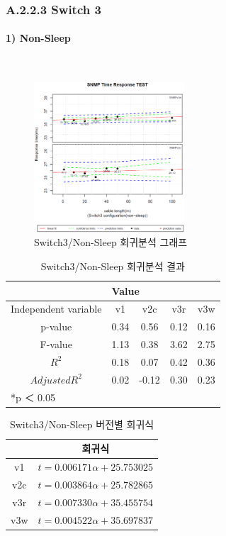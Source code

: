 \documentclass[11pt
  , a4paper
  , article
  , oneside
]{memoir}
\begin{document}
\subsubsection{A.2.2.3 Switch 3}
\paragraph{1) Non-Sleep}
   　
\begin{figure}[h!]
  \centering
  \includegraphics[width=0.5\textwidth]{./images/s3sx.eps}
  \caption{Switch3/Non-Sleep 회귀분석 그래프}
\end{figure}


\begin{table}[!htb]
\begin{center}
\begin{tabular}{c|c|c|c|c}\hline
& \multicolumn{4}{l}{Value} \\ \hline
Independent variable & v1 & v2c & v3r & v3w \\ \hline\hline
p-value& 0.34 & 0.56 & 0.12 & 0.16 \\ \hline
F-value& 1.13 & 0.38 & 3.62 & 2.75 \\ \hline
$  R^2  $ & 0.18 & 0.07 & 0.42 & 0.36 \\\hline
$ Adjusted R^2 $ & 0.02 & -0.12 & 0.30 & 0.23 \\\hline 
\multicolumn{5}{l}{*p ＜ 0.05} \\ \hline
\end{tabular}
\caption{Switch3/Non-Sleep 회귀분석 결과}
\end{center}
\end{table} 

\begin{table}[!htb]
\begin{center}
\begin{tabular}{c|c}\hline
 & 회귀식  \\ \hline\hline
v1 &  $ t=0.006171\alpha + 25.753025 $  \\ 
v2c & $ t=0.003864\alpha + 25.782865 $ \\ 
v3r & $ t=0.007330\alpha + 35.455754 $ \\ 
v3w & $ t=0.004522\alpha + 35.697837 $  \\ \hline
\end{tabular}
\caption{Switch3/Non-Sleep 버전별 회귀식}
\end{center}
\end{table} 
\end{document}

